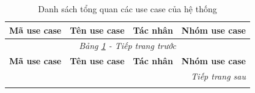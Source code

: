﻿\documentclass[../DoAn.tex]{subfiles}
\begin{document}
\begingroup
\small
\renewcommand{\arraystretch}{1.15}
\setlength{\LTpre}{0pt}
\setlength{\LTpost}{0pt}
\begin{longtable}{|p{1.7cm}|p{4.4cm}|p{2.7cm}|p{4.1cm}|}
\caption{Danh sách tổng quan các use case của hệ thống}
\label{table:danh_sach_use_case_he_thong} \\
\hline
\textbf{Mã use case} & \textbf{Tên use case} & \textbf{Tác nhân} & \textbf{Nhóm use case} \\ \hline
\endfirsthead

\hline
\multicolumn{4}{|c|}{\textit{Bảng \ref{table:danh_sach_use_case_he_thong} - Tiếp trang trước}} \\ \hline
\textbf{Mã use case} & \textbf{Tên use case} & \textbf{Tác nhân} & \textbf{Nhóm use case} \\ \hline
\endhead

\hline
\multicolumn{4}{|r|}{\textit{Tiếp trang sau}} \\ \hline
\endfoot

\hline
\endlastfoot


\end{longtable}
\end{document}
